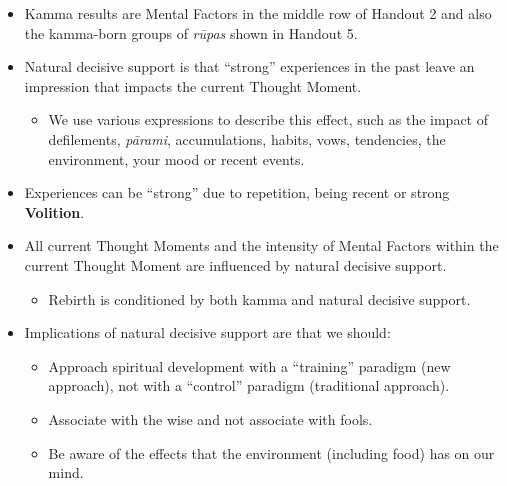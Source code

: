 \begin{itemize}
\item Kamma results are Mental Factors in the middle row of Handout 2 and also the kamma-born groups of \textit{rūpas} shown in Handout 5.

\item Natural decisive support is that “strong” experiences in the past leave an impression that impacts the current Thought Moment.

\begin{itemize}

\item We use various expressions to describe this effect, such as the impact of defilements, \textit{pārami}, accumulations, habits, vows, tendencies, the environment, your mood or recent events.

\end{itemize}

\item Experiences can be “strong” due to repetition, being recent or strong \textbf{Volition}.

\item All current Thought Moments and the intensity of Mental Factors within the current Thought Moment are influenced by natural decisive support.

\begin{itemize}

\item Rebirth is conditioned by both kamma and natural decisive support.

\end{itemize}

\item Implications of natural decisive support are that we should:

\begin{itemize}

\item Approach spiritual development with a “training” paradigm (new approach), not with a “control” paradigm (traditional approach).

\item Associate with the wise and not associate with fools.

\item Be aware of the effects that the environment (including food) has on our mind.

\end{itemize}

\end{itemize}

